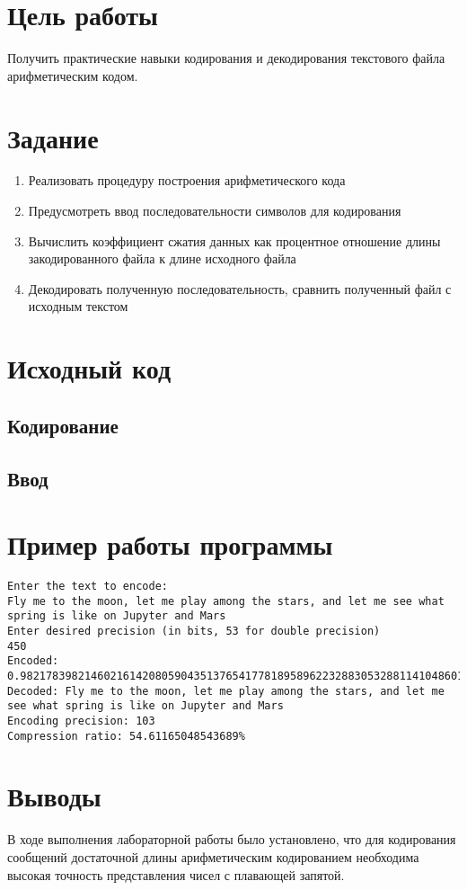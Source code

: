 \documentclass[listings]{labreport}
\begin{document}
\maketitlepage

\section*{Цель работы}

Получить практические навыки кодирования и декодирования текстового файла
арифметическим кодом.

\section*{Задание}

\begin{enumerate}
\item Реализовать процедуру построения арифметического кода
\item Предусмотреть ввод последовательности символов для кодирования
\item Вычислить коэффициент сжатия данных как процентное отношение
  длины закодированного файла к длине исходного файла
\item Декодировать полученную последовательность,
  сравнить полученный файл с исходным текстом
\end{enumerate}

\section*{Исходный код}

\subsection*{Кодирование}



\subsection*{Ввод}



\section*{Пример работы программы}

\begin{scriptsize}
\begin{verbatim}
Enter the text to encode:
Fly me to the moon, let me play among the stars, and let me see what spring is like on Jupyter and Mars
Enter desired precision (in bits, 53 for double precision)
450
Encoded: 0.9821783982146021614208059043513765417781895896223288305328811410486010602429103146656947712082555708095342416578377510963963423517698176
Decoded: Fly me to the moon, let me play among the stars, and let me see what spring is like on Jupyter and Mars
Encoding precision: 103
Compression ratio: 54.61165048543689%
\end{verbatim}
\end{scriptsize}

\section*{Выводы}

В ходе выполнения лабораторной работы было установлено, что для кодирования
сообщений достаточной длины арифметическим кодированием необходима высокая точность
представления чисел с плавающей запятой.
\end{document}

